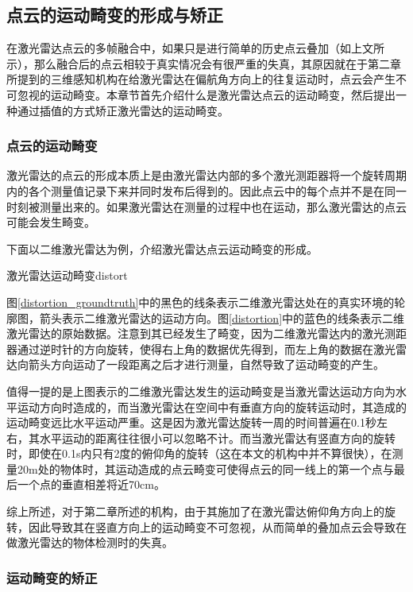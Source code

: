\subsection{点云的运动畸变的形成与矫正}
在激光雷达点云的多帧融合中，如果只是进行简单的历史点云叠加（如上文所示），那么融合后的点云相较于真实情况会有很严重的失真，其原因就在于第二章所提到的三维感知机构在给激光雷达在偏航角方向上的往复运动时，点云会产生不可忽视的运动畸变。本章节首先介绍什么是激光雷达点云的运动畸变，然后提出一种通过插值的方式矫正激光雷达的运动畸变。

\subsubsection{点云的运动畸变}
激光雷达的点云的形成本质上是由激光雷达内部的多个激光测距器将一个旋转周期内的各个测量值记录下来并同时发布后得到的。因此点云中的每个点并不是在同一时刻被测量出来的。如果激光雷达在测量的过程中也在运动，那么激光雷达的点云可能会发生畸变。

下面以二维激光雷达为例，介绍激光雷达点云运动畸变的形成。

\begin{pics}[htbp]{激光雷达运动畸变}{distort}
\end{pics}

图\ref{distortion_groundtruth}中的黑色的线条表示二维激光雷达处在的真实环境的轮廓图，箭头表示二维激光雷达的运动方向。图\ref{distortion}中的蓝色的线条表示二维激光雷达的原始数据。注意到其已经发生了畸变，因为二维激光雷达内的激光测距器通过逆时针的方向旋转，使得右上角的数据优先得到，而左上角的数据在激光雷达向箭头方向运动了一段距离之后才进行测量，自然导致了运动畸变的产生。

值得一提的是上图表示的二维激光雷达发生的运动畸变是当激光雷达运动方向为水平运动方向时造成的，而当激光雷达在空间中有垂直方向的旋转运动时，其造成的运动畸变远比水平运动严重。这是因为激光雷达旋转一周的时间普遍在0.1秒左右，其水平运动的距离往往很小可以忽略不计。而当激光雷达有竖直方向的旋转时，即使在0.1s内只有2度的俯仰角的旋转（这在本文的机构中并不算很快），在测量20m处的物体时，其运动造成的点云畸变可使得点云的同一线上的第一个点与最后一个点的垂直相差将近70cm。

综上所述，对于第二章所述的机构，由于其施加了在激光雷达俯仰角方向上的旋转，因此导致其在竖直方向上的运动畸变不可忽视，从而简单的叠加点云会导致在做激光雷达的物体检测时的失真。

\subsubsection{运动畸变的矫正}

